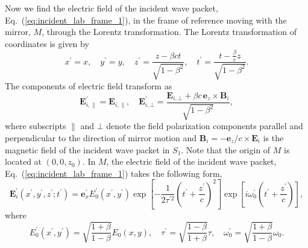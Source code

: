 \documentclass[10pt, a4paper, twoside, openright]{report}
\renewcommand{\vec}[1]{\mathbf{#1}}
\begin{document}
Now we find the electric field of the incident wave packet, Eq.~(\ref{eq:incident_lab_frame_1}), in the frame of reference moving with the mirror, $ M $, through the Lorentz transformation. The Lorentz transformation of coordinates is given by
\begin{equation}\label{eq:lorentz_transform_coords}
x^{\prime} = x, \quad y^{\prime} = y, \quad z^{\prime} = \frac{z - \beta c t}{\sqrt{1 - \beta^2}}, \quad t^{\prime} = \frac{t - \frac{\beta}{c} z}{\sqrt{1 - \beta^2}}.
\end{equation}
The components of electric field transform as
\begin{equation}\label{eq:lorentz_transform_fields}
\vec{E}^{\prime}_{i, \parallel} = \vec{E}_{i, \parallel}, \quad \vec{E}^{\prime}_{i, \bot} = \frac{\vec{E}_{i, \bot} + \beta c \, \vec{e}_z \times \vec{B}_{i}}{\sqrt{1 - \beta^2}},
\end{equation}
where subscripts $ \parallel $ and $ \bot $ denote the field polarization components parallel and perpendicular to the direction of mirror motion and $ \vec{B}_{i} = -\vec{e}_z / c \times \vec{E}_i $ is the magnetic field of the incident wave packet in $ S_1 $. Note that the origin of $ M $ is located at $ \left( 0, 0, z_0 \right) $. In $ M $, the electric field of the incident wave packet, Eq.~(\ref{eq:incident_lab_frame_1}) takes the following form,
\begin{equation}\label{eq:incident_boost_frame}
\vec{E}^{\prime}_i \left(x^{\prime}, y^{\prime}, z^{\prime}; t^{\prime} \right) = \vec{e}_x^{\prime} E^{\prime}_0 \left(x^{\prime}, y^{\prime} \right) \exp \left[ - \frac{1}{2 \tau^{\prime 2}} \left(t^{\prime} + \frac{z^{\prime}}{c}\right)^2 \right] \exp \left[ i \omega_0^{\prime} \left(t^{\prime} + \frac{z^{\prime}}{c}\right) \right],
\end{equation}
where
\begin{equation}\label{eq:coeff_boost}
E^{\prime}_0 \left(x^{\prime}, y^{\prime} \right) = \sqrt{\frac{1 + \beta}{1 - \beta}} E_0 \left(x, y \right), \quad \tau^{\prime} = \sqrt{\frac{1 - \beta}{1 + \beta}} \tau, \quad \omega_0^{\prime} = \sqrt{\frac{1 + \beta}{1 - \beta}} \omega_0.
\end{equation}
\end{document}

